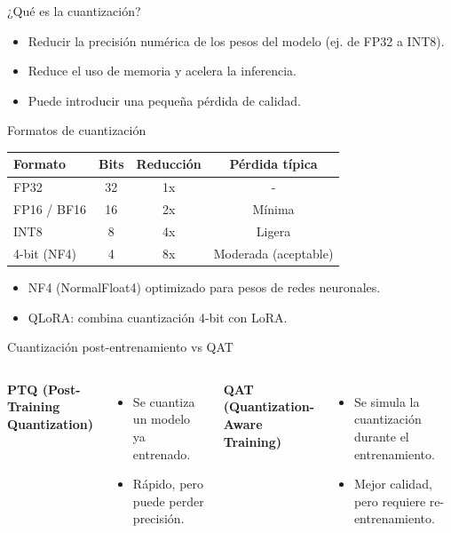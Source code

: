 \documentclass[aspectratio=169, 10pt, xcolor=table]{beamer}
\begin{document}
\begin{frame}{¿Qué es la cuantización?}
    \begin{itemize}
        \item Reducir la precisión numérica de los pesos del modelo (ej. de FP32 a INT8).
        \item Reduce el uso de memoria y acelera la inferencia.
        \item Puede introducir una pequeña pérdida de calidad.
    \end{itemize}
\end{frame}

\begin{frame}{Formatos de cuantización}
    \begin{table}
        \centering
        \begin{tabular}{l|c|c|c}
            \toprule
            \textbf{Formato} & \textbf{Bits} & \textbf{Reducción} & \textbf{Pérdida típica} \\
            \midrule
            FP32 & 32 & 1x & - \\
            FP16 / BF16 & 16 & 2x & Mínima \\
            INT8 & 8 & 4x & Ligera \\
            4-bit (NF4) & 4 & 8x & Moderada (aceptable) \\
            \bottomrule
        \end{tabular}
    \end{table}
    \begin{itemize}
        \item NF4 (NormalFloat4) optimizado para pesos de redes neuronales.
        \item QLoRA: combina cuantización 4-bit con LoRA.
    \end{itemize}
\end{frame}

\begin{frame}{Cuantización post-entrenamiento vs QAT}
    \begin{columns}[t]
        \textbf{PTQ (Post-Training Quantization)}
        \begin{itemize}
            \item Se cuantiza un modelo ya entrenado.
            \item Rápido, pero puede perder precisión.
        \end{itemize}
        \textbf{QAT (Quantization-Aware Training)}
        \begin{itemize}
            \item Se simula la cuantización durante el entrenamiento.
            \item Mejor calidad, pero requiere re-entrenamiento.
        \end{itemize}
    \end{columns}
\end{frame}
\end{document}
